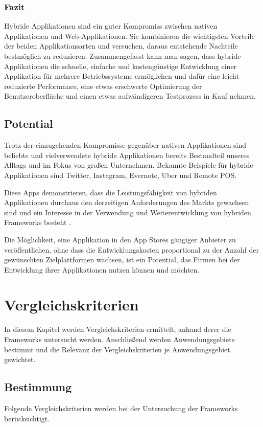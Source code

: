 \documentclass[]{lni}
\begin{document}
\subsubsection*{Fazit}
Hybride Applikationen sind ein guter Kompromiss zwischen nativen Applikationen und Web-Applikationen. Sie kombinieren die wichtigsten Vorteile der beiden Applikationsarten und versuchen, daraus entstehende Nachteile bestmöglich zu reduzieren. Zusammengefasst kann man sagen, dass hybride Applikationen die schnelle, einfache und kostengünstige Entwicklung einer Applikation für mehrere Betriebssysteme ermöglichen und dafür eine leicht reduzierte Performance, eine etwas erschwerte Optimierung der Benutzeroberfläche und einen etwas aufwändigeren Testprozess in Kauf nehmen.


\subsection{Potential}
Trotz der einzugehenden Kompromisse gegenüber nativen Applikationen sind beliebte und vielverwendete hybride Applikationen bereits Bestandteil unseres Alltags und im Fokus von großen Unternehmen. Bekannte Beispiele für hybride Applikationen sind Twitter, Instagram, Evernote, Uber und Remote POS.

Diese Apps demonstrieren, dass die Leistungsfähigkeit von hybriden Applikationen durchaus den derzeitigen Anforderungen des Markts gewachsen sind und ein Interesse in der Verwendung und Weiterentwicklung von hybriden Frameworks besteht \cite{Dharmwan.27.04.2021}.

Die Möglichkeit, eine Applikation in den App Stores gängiger Anbieter zu veröffentlichen, ohne dass die Entwicklungskosten proportional zu der Anzahl der gewünschten Zielplattformen wachsen, ist ein Potential, das Firmen bei der Entwicklung ihrer Applikationen nutzen können und möchten.

\clearpage

\section{Vergleichskriterien}
In diesem Kapitel werden Vergleichskriterien ermittelt, anhand derer die Frameworks untersucht werden. Anschließend werden Anwendungsgebiete bestimmt und die Relevanz der Vergleichskriterien je Anwendungsgebiet gewichtet.

\subsection{Bestimmung}
Folgende Vergleichskriterien werden bei der Untersuchung der Frameworks berücksichtigt.
\end{document}
